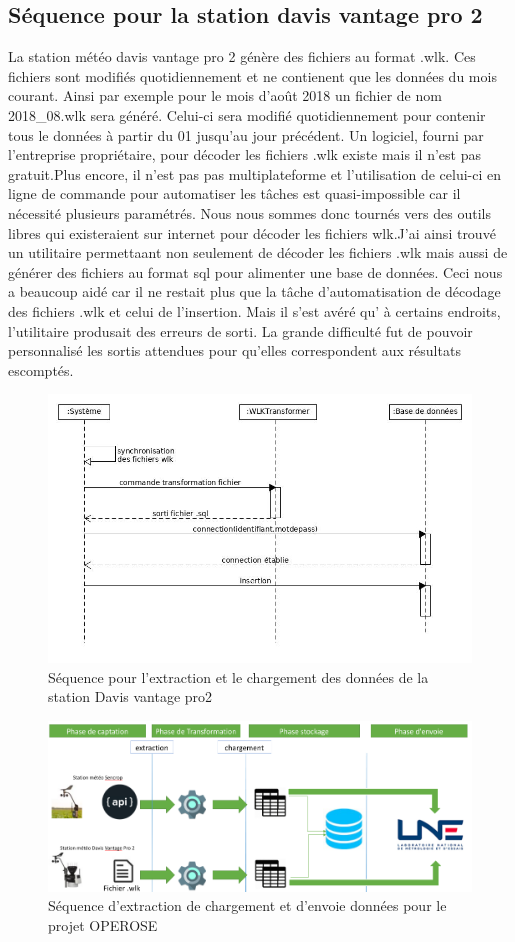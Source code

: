 \subsection{Séquence pour la station davis vantage pro 2} 
La station météo davis vantage pro 2 génère des fichiers au format .wlk. Ces fichiers sont modifiés quotidiennement et ne contienent que les données du mois courant. Ainsi par exemple pour le mois d’août 2018 un fichier de nom 2018\_08.wlk sera généré. Celui-ci sera modifié quotidiennement pour contenir tous le données à partir du 01 jusqu’au jour précédent. Un logiciel, fourni par l’entreprise propriétaire, pour décoder les fichiers .wlk existe mais il n’est pas gratuit.Plus encore, il n’est pas pas multiplateforme et l’utilisation de celui-ci en ligne de commande pour automatiser les tâches est quasi-impossible car il nécessité plusieurs paramétrés. Nous nous sommes donc tournés vers des outils libres qui existeraient sur internet pour décoder les fichiers wlk.J'ai ainsi trouvé un utilitaire permettaant non seulement de décoder les fichiers .wlk mais aussi de générer des fichiers au format sql pour alimenter une base de données. Ceci nous a beaucoup aidé car il ne restait plus que la tâche d'automatisation  de décodage des fichiers .wlk et celui de l’insertion. Mais il s’est avéré qu' à certains endroits, l’utilitaire produsait des erreurs de sorti. La grande difficulté fut de pouvoir personnalisé les sortis attendues pour qu’elles correspondent aux résultats escomptés. 

\begin{figure}
    
    \centering
     \includegraphics[width=.7\textwidth]{images/davis_senquence_diagrame.jpg}
     \caption{ Séquence pour l'extraction et le chargement des données de la station Davis vantage pro2}
     \label{diagramme de séquence station sencrop}
\end{figure}


\begin{figure}[!h]
    \centering
     \includegraphics[width=1\textwidth]{images/processusOperose.png}
     \caption{ Séquence d'extraction de chargement et d'envoie données pour le projet OPEROSE}
     \label{diagremme de séquence station Davis}
\end{figure}
     

